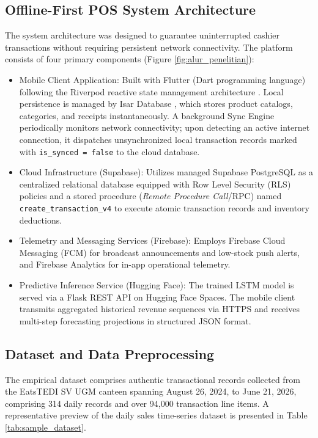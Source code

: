 \documentclass[10pt,a4paper]{article}
\begin{document}
\subsection{Offline-First POS System Architecture}
The system architecture was designed to guarantee uninterrupted cashier transactions without requiring persistent network connectivity. The platform consists of four primary components (Figure \ref{fig:alur_penelitian}):
\begin{itemize}
  \item Mobile Client Application: Built with Flutter (Dart programming language) following the Riverpod reactive state management architecture \cite{flutter2026, remi2023riverpod}. Local persistence is managed by Isar Database \cite{isar2024docs}, which stores product catalogs, categories, and receipts instantaneously. A background Sync Engine periodically monitors network connectivity; upon detecting an active internet connection, it dispatches unsynchronized local transaction records marked with \texttt{is\_synced = false} to the cloud database.
  \item Cloud Infrastructure (Supabase): Utilizes managed Supabase PostgreSQL as a centralized relational database equipped with Row Level Security (RLS) policies \cite{supabase2024docs} and a stored procedure (\textit{Remote Procedure Call}/RPC) named \texttt{create\_transaction\_v4} to execute atomic transaction records and inventory deductions.
  \item Telemetry and Messaging Services (Firebase): Employs Firebase Cloud Messaging (FCM) for broadcast announcements and low-stock push alerts, and Firebase Analytics for in-app operational telemetry.
  \item Predictive Inference Service (Hugging Face): The trained LSTM model is served via a Flask REST API on Hugging Face Spaces. The mobile client transmits aggregated historical revenue sequences via HTTPS and receives multi-step forecasting projections in structured JSON format.
\end{itemize}

\subsection{Dataset and Data Preprocessing}
The empirical dataset comprises authentic transactional records collected from the EatsTEDI SV UGM canteen spanning August 26, 2024, to June 21, 2026, comprising 314 daily records and over 94,000 transaction line items. A representative preview of the daily sales time-series dataset is presented in Table \ref{tab:sample_dataset}.
\end{document}
